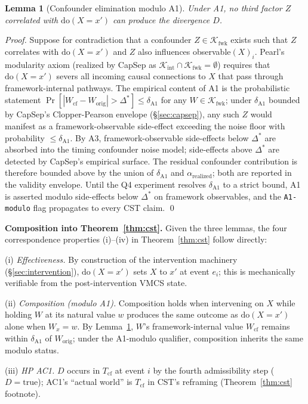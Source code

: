 \documentclass[conference]{IEEEtran}
\newtheorem{lemma}{Lemma}
\newcommand{\Tcf}{T_\text{cf}}
\newcommand{\Kint}{\mathcal{K}_\text{int}}
\newcommand{\Kfwk}{\mathcal{K}_\text{fwk}}
\newcommand{\Dstar}{\Delta^{*}}
\newcommand{\arealized}{\alpha_\text{realized}}
\newcommand{\dox}[1]{\text{do}(X{=}#1)}
\begin{document}
\begin{lemma}[Confounder elimination modulo A1]
\label{lem:confounder}
Under A1, no third factor $Z$ correlated with $\dox{x'}$ can
produce the divergence $D$.
\end{lemma}

\textit{Proof.} Suppose for contradiction that a confounder
$Z \in \Kfwk$ exists such that $Z$ correlates with $\dox{x'}$ and
$Z$ also influences observable$(X)_i$. Pearl's modularity axiom
(realized by CapSep as $\Kint \cap \Kfwk = \emptyset$) requires
that $\dox{x'}$ severs all incoming causal connections to $X$
that pass through framework-internal pathways. The empirical
content of A1 is the probabilistic statement
$\Pr[|W_{\text{cf}} - W_{\text{orig}}| > \Dstar] \leq
\delta_{\text{A1}}$ for any $W \in \Kfwk$; under
$\delta_{\text{A1}}$ bounded by CapSep's Clopper-Pearson envelope
(\S\ref{sec:capsep}), any such $Z$ would manifest as a
framework-observable side-effect exceeding the noise floor with
probability $\leq \delta_{\text{A1}}$. By A3, framework-observable
side-effects below $\Dstar$ are absorbed into the timing
confounder noise model; side-effects above $\Dstar$ are detected
by CapSep's empirical surface. The residual confounder
contribution is therefore bounded above by the union of
$\delta_{\text{A1}}$ and $\arealized$; both are reported in the
validity envelope. Until the Q4 experiment resolves
$\delta_{\text{A1}}$ to a strict bound, A1 is asserted modulo
side-effects below $\Dstar$ on framework observables, and the
\texttt{A1-modulo} flag propagates to every CST claim. \qed

\textbf{Composition into Theorem~\ref{thm:cst}.} Given the three
lemmas, the four correspondence properties (i)--(iv) in
Theorem~\ref{thm:cst} follow directly:

(i) \emph{Effectiveness.} By construction of the intervention
machinery (\S\ref{sec:intervention}), $\dox{x'}$ sets $X$ to
$x'$ at event $e_i$; this is mechanically verifiable from the
post-intervention VMCS state.

(ii) \emph{Composition (modulo A1).} Composition holds when
intervening on $X$ while holding $W$ at its natural value $w$
produces the same outcome as $\dox{x'}$ alone when $W_x = w$. By
Lemma~\ref{lem:confounder}, $W$'s framework-internal value
$W_{\text{cf}}$ remains within $\delta_{\text{A1}}$ of
$W_{\text{orig}}$; under the A1-modulo qualifier, composition
inherits the same modulo status.

(iii) \emph{HP AC1.} $D$ occurs in $\Tcf$ at event $i$ by the
fourth admissibility step ($D = \text{true}$); AC1's ``actual
world'' is $\Tcf$ in CST's reframing (Theorem~\ref{thm:cst}
footnote).
\end{document}
